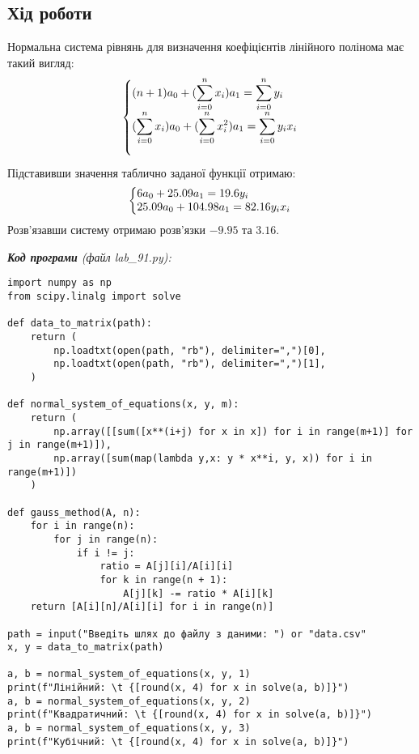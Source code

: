 \documentclass{article}
\newcommand\lab{9}
\begin{document}
\begin{large}
		\section*{Хід роботи}	
		Нормальна система рівнянь для визначення коефіцієнтів лінійного полінома має такий вигляд:
		\begin{gather}
			\left\{\begin{array}{@{}l@{}}
				\displaystyle(n+1)a_0 + (\sum_{i=0}^{n}x_i)a_1= \sum_{i=0}^{n}y_i\\\nonumber
				\displaystyle(\sum_{i=0}^{n}x_i)a_0 + (\sum_{i=0}^{n}x_i^2)a_1= \sum_{i=0}^{n}y_ix_i\\\nonumber
			\end{array}\right.\,
		\end{gather}
		Підставивши значення таблично заданої функції отримаю:
		\begin{gather}
			\left\{\begin{array}{@{}l@{}}
				6a_0 + 25.09a_1= 19.6y_i\\\nonumber
				25.09a_0 + 104.98a_1= 82.16y_ix_i\nonumber
			\end{array}\right.\,
		\end{gather}
		Розв'язавши систему отримаю розв'язки $-9.95$ та $3.16$.
			
		\noindent\textit{\textbf{Код програми} (файл lab\_\lab1.py):}
		\begin{lstlisting}
import numpy as np
from scipy.linalg import solve

def data_to_matrix(path):
	return (
		np.loadtxt(open(path, "rb"), delimiter=",")[0],
		np.loadtxt(open(path, "rb"), delimiter=",")[1],
	)

def normal_system_of_equations(x, y, m):
	return (
		np.array([[sum([x**(i+j) for x in x]) for i in range(m+1)] for j in range(m+1)]),
		np.array([sum(map(lambda y,x: y * x**i, y, x)) for i in range(m+1)])
	)

def gauss_method(A, n):
	for i in range(n):
		for j in range(n):
			if i != j:
				ratio = A[j][i]/A[i][i]
				for k in range(n + 1):
					A[j][k] -= ratio * A[i][k]
	return [A[i][n]/A[i][i] for i in range(n)]

path = input("Введіть шлях до файлу з даними: ") or "data.csv"
x, y = data_to_matrix(path)

a, b = normal_system_of_equations(x, y, 1)
print(f"Лінійний: \t {[round(x, 4) for x in solve(a, b)]}")
a, b = normal_system_of_equations(x, y, 2)
print(f"Квадратичний: \t {[round(x, 4) for x in solve(a, b)]}")
a, b = normal_system_of_equations(x, y, 3)
print(f"Кубічний: \t {[round(x, 4) for x in solve(a, b)]}")\end{lstlisting}
		

\end{large}
\end{document}
